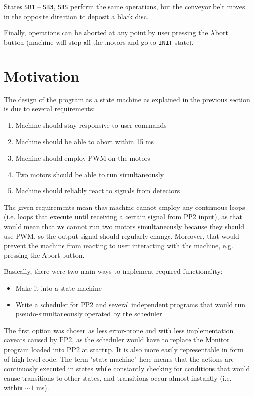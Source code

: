 \documentclass[a4paper,oneside,11pt]{report}
\begin{document}
States \texttt{SB1} -- \texttt{SB3}, \texttt{SBS} perform the same operations, but the conveyor belt moves in the opposite direction to deposit a black disc.

Finally, operations can be aborted at any point by user pressing the Abort button (machine will stop all the motors and go to \texttt{INIT} state).

\pagebreak

\section{Motivation}
The design of the program as a state machine as explained in the previous section is due to several requirements:
\begin{enumerate}
\item Machine should stay responsive to user commands
\item Machine should be able to abort within 15 ms
\item Machine should employ PWM on the motors
\item Two motors should be able to run simultaneously
\item Machine should reliably react to signals from detectors
\end{enumerate}
The given requirements mean that machine cannot employ any continuous loops (i.e. loops that execute until receiving a certain signal from PP2 input), as that would mean that we cannot run two motors simultaneously because they should use PWM, so the output signal should regularly change. Moreover, that would prevent the machine from reacting to user interacting with the machine, e.g. pressing the Abort button.

Basically, there were two main ways to implement required functionality:
\begin{itemize}
\item Make it into a state machine
\item Write a scheduler for PP2 and several independent programs that would run pseudo-simultaneously operated by the scheduler
\end{itemize}
The first option was chosen as less error-prone and with less implementation caveats caused by PP2, as the scheduler would have to replace the Monitor program loaded into PP2 at startup. It is also more easily representable in form of high-level code. The term "state machine" here means that the actions are continuosly executed in states while constantly checking for conditions that would cause transitions to other states, and transitions occur almost instantly (i.e. within \(\sim 1\) ms).
\end{document}
